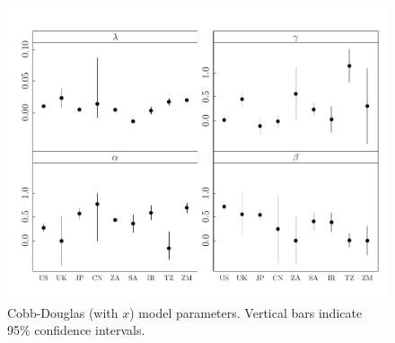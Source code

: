 \documentclass[preprint,authoryear,12pt]{elsarticle}\usepackage{graphicx, color}
\makeatletter
\def\maxwidth{ %
  \ifdim\Gin@nat@width>\linewidth
    \linewidth
  \else
    \Gin@nat@width
  \fi
}
\newenvironment{kframe}{%
 \def\at@end@of@kframe{}%
 \ifinner\ifhmode%
  \def\at@end@of@kframe{\end{minipage}}%
  \begin{minipage}{\columnwidth}%
 \fi\fi%
 \def\FrameCommand##1{\hskip\@totalleftmargin \hskip-\fboxsep
 \colorbox{shadecolor}{##1}\hskip-\fboxsep
     \hskip-\linewidth \hskip-\@totalleftmargin \hskip\columnwidth}%
 \MakeFramed {\advance\hsize-\width
   \@totalleftmargin\z@ \linewidth\hsize
   \@setminipage}}%
 {\par\unskip\endMakeFramed%
 \at@end@of@kframe}
\newenvironment{knitrout}{}{} %
\makeatother
\begin{document}
\begin{knitrout}
\begin{kframe}
{\ttfamily\noindent\color{warningcolor}{Warning: step factor 0.000488281 reduced below 'minFactor' of 0.000976562}}\end{kframe}\begin{figure}[]

\includegraphics[width=\maxwidth]{figure/CDx_Params_Graph} \caption[Cobb-Douglas (with $x$) model parameters]{Cobb-Douglas (with $x$) model parameters. Vertical bars indicate 95\% confidence intervals.\label{fig:CDx_Params_Graph}}
\end{figure}


\end{knitrout}
\end{document}
